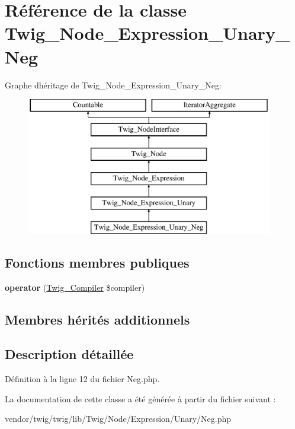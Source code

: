 \hypertarget{class_twig___node___expression___unary___neg}{}\section{Référence de la classe Twig\+\_\+\+Node\+\_\+\+Expression\+\_\+\+Unary\+\_\+\+Neg}
\label{class_twig___node___expression___unary___neg}
Graphe d\textquotesingle{}héritage de Twig\+\_\+\+Node\+\_\+\+Expression\+\_\+\+Unary\+\_\+\+Neg\+:\begin{figure}[H]
\begin{center}
\leavevmode
\includegraphics[height=6.000000cm]{class_twig___node___expression___unary___neg}
\end{center}
\end{figure}
\subsection*{Fonctions membres publiques}
\begin{DoxyCompactItemize}
\item 
{\bfseries operator} (\hyperlink{class_twig___compiler}{Twig\+\_\+\+Compiler} \$compiler)\hypertarget{class_twig___node___expression___unary___neg_af77318ec88d5f8a508684970a150b670}{}\label{class_twig___node___expression___unary___neg_af77318ec88d5f8a508684970a150b670}

\end{DoxyCompactItemize}
\subsection*{Membres hérités additionnels}


\subsection{Description détaillée}


Définition à la ligne 12 du fichier Neg.\+php.



La documentation de cette classe a été générée à partir du fichier suivant \+:\begin{DoxyCompactItemize}
\item 
vendor/twig/twig/lib/\+Twig/\+Node/\+Expression/\+Unary/Neg.\+php\end{DoxyCompactItemize}
